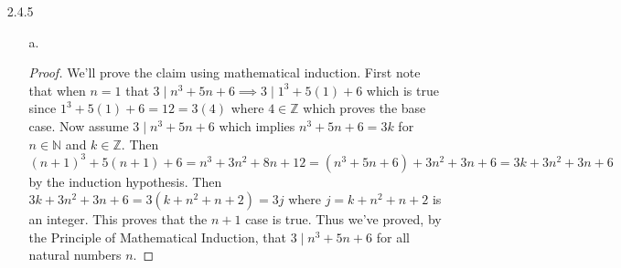 \documentclass[11pt]{amsart}
\theoremstyle{definition}
\begin{document}
\begin{itemize}
\begin{itemize}
    \item[d.]\begin{proof}
        We’ll prove the claim using mathematical induction. First note that when $n=1$ that $1\cdot1!+2\cdot2!+3\cdot3!+\ldots n\cdots n!=(n+1)!-1\implies 1\cdot 1!=2!-1$ so the base case holds. Now assume $1\cdot1!+2\cdot2!+3\cdot3!+\ldots n\cdot n!=(n+1)!-1$ for all $n\in\mathbb{N}$. Then $1\cdot1!+2\cdot2!+3\cdot3!+\ldots n\cdot n!+(n+1)\cdot(n+1)!=(n+1)!-1+(n+1)\cdot(n+1)!$ by the induction hypothesis. Then $(n+1)!-1+(n+1)\cdot(n+1)!=(n+2)(n+1)!-1=(n+2)!-1$ which proves the $n+1$ case. Thus we've proved, by the Principle of Mathematical Induction, that $1\cdot1!+2\cdot2!+3\cdot3!+\ldots n\cdots n!=(n+1)!-1$ for all natural numbers $n$.
    \end{proof}
    
    \item[e.]\begin{proof}
        We’ll prove the claim using mathematical induction. First note that when $n=1$ that $1^3+2^3+3^3+\ldots n^3=[\frac{n(n+1)}2]^2\implies 1^3=[\frac22]^2$ which proves the base case is true. Now assume $1^3+2^3+3^3+\ldots n^3=[\frac{n(n+1)}2]^2$ for all $n\in\mathbb{N}$. Then $1^3+2^3+3^3+\ldots n^3+(n+1)^3=[\frac{n(n+1)}2]^2+(n+1)^3$ by the induction hypothesis. Then: \begin{align*}
            [\frac{n(n+1)}2]^2+(n+1)^3&=
            \frac{(n(n+1))^2+4(n+1)^3}{4} \\
            &=\frac{n^2(n+1)^2+4(n+1)(n+1)^2}{4} \\
            &=\frac{(n+1)^2(n^2+4n+4)}{4}\\
            &=\frac{(n+1)^2(n+2)^2}{4}\\
            &=[\frac{(n+1)(n+2)}2]^2
        \end{align*}
        which proves the $n+1$ case. Thus we've proved, by the Principle of Mathematical Induction, that $1^3+2^3+3^3+\ldots n^3=[\frac{n(n+1)}2]^2$ for all natural numbers $n$.
    \end{proof}
    
\end{itemize}

\item[2.4.5]
\begin{itemize}
    \item[a.]\begin{proof}
        We’ll prove the claim using mathematical induction. First note that when $n=1$ that $3\mid n^3+5n+6\implies 3\mid 1^3+5(1)+6$ which is true since $1^3+5(1)+6=12=3(4)$ where $4\in\mathbb{Z}$ which proves the base case. Now assume $3\mid n^3+5n+6$ which implies $n^3+5n+6=3k$ for $n\in\mathbb{N}$ and $k\in\mathbb{Z}$. Then $(n+1)^3+5(n+1)+6=n^3+3n^2+8n+12=(n^3+5n+6)+3n^2+3n+6=3k+3n^2+3n+6$ by the induction hypothesis. Then $3k+3n^2+3n+6=3(k+n^2+n+2)=3j$ where $j=k+n^2+n+2$ is an integer. This proves that the $n+1$ case is true. Thus we've proved, by the Principle of Mathematical Induction, that $3\mid n^3+5n+6$ for all natural numbers $n$.
    \end{proof}
    

\end{itemize}
\end{itemize}
\end{document}
